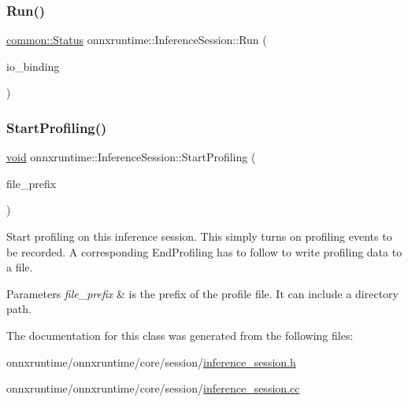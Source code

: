\mbox{\label{classonnxruntime_1_1InferenceSession_a368fe68929fde82474199bfe581e24ce}} 
\subsubsection{\texorpdfstring{Run()}{Run()}\hspace{0.1cm}{\footnotesize\ttfamily [4/4]}}
{\footnotesize\ttfamily \mbox{\hyperlink{classonnxruntime_1_1common_1_1Status}{common\+::\+Status}} onnxruntime\+::\+Inference\+Session\+::\+Run (\begin{DoxyParamCaption}\item[{\mbox{\hyperlink{classonnxruntime_1_1IOBinding}{I\+O\+Binding}} \&}]{io\+\_\+binding }\end{DoxyParamCaption})}

\mbox{\label{classonnxruntime_1_1InferenceSession_ab29bd2f63b9f4d5840e846f8bf705e8a}} 
\subsubsection{\texorpdfstring{Start\+Profiling()}{StartProfiling()}}
{\footnotesize\ttfamily \mbox{\hyperlink{mlasi_8h_a88f941d423cb2a819b70a1358982b1a6}{void}} onnxruntime\+::\+Inference\+Session\+::\+Start\+Profiling (\begin{DoxyParamCaption}\item[{const std\+::string \&}]{file\+\_\+prefix }\end{DoxyParamCaption})}

Start profiling on this inference session. This simply turns on profiling events to be recorded. A corresponding End\+Profiling has to follow to write profiling data to a file. 
\begin{DoxyParams}{Parameters}
{\em file\+\_\+prefix} & is the prefix of the profile file. It can include a directory path. \\
\hline
\end{DoxyParams}


The documentation for this class was generated from the following files\+:\begin{DoxyCompactItemize}
\item 
onnxruntime/onnxruntime/core/session/\mbox{\hyperlink{inference__session_8h}{inference\+\_\+session.\+h}}\item 
onnxruntime/onnxruntime/core/session/\mbox{\hyperlink{inference__session_8cc}{inference\+\_\+session.\+cc}}\end{DoxyCompactItemize}

